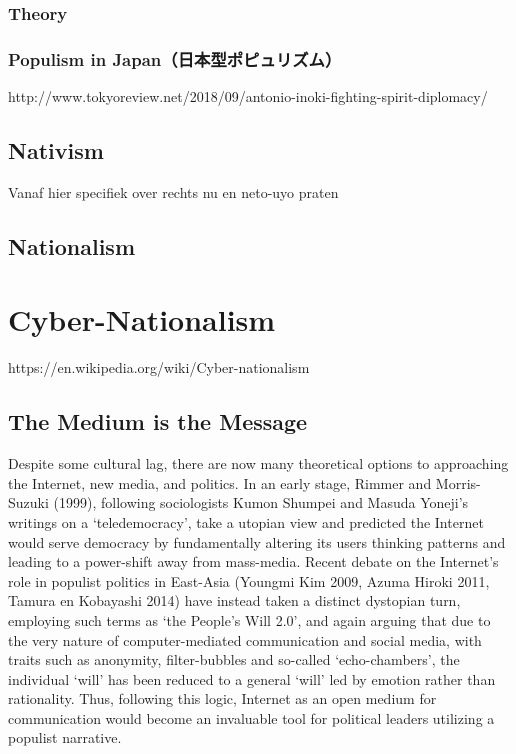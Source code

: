 \documentclass[10pt,british,A4paper,,openany]{memoir}
\begin{document}
\subsubsection{Theory}\label{theory}

\subsubsection{Populism in
Japan（日本型ポピュリズム）}\label{populism-in-japanux65e5ux672cux578bux30ddux30d4ux30e5ux30eaux30baux30e0}

http://www.tokyoreview.net/2018/09/antonio-inoki-fighting-spirit-diplomacy/

\subsection{Nativism}\label{nativism}

Vanaf hier specifiek over rechts nu en neto-uyo praten

\subsection{Nationalism}\label{nationalism}

\section{Cyber-Nationalism}\label{cyber-nationalism}

https://en.wikipedia.org/wiki/Cyber-nationalism

\subsection{The Medium is the Message}\label{the-medium-is-the-message}

Despite some cultural lag, there are now many theoretical options to
approaching the Internet, new media, and politics. In an early stage,
Rimmer and Morris-Suzuki (1999), following sociologists Kumon Shumpei
and Masuda Yoneji's writings on a `teledemocracy', take a utopian view
and predicted the Internet would serve democracy by fundamentally
altering its users thinking patterns and leading to a power-shift away
from mass-media. Recent debate on the Internet's role in populist
politics in East-Asia (Youngmi Kim 2009, Azuma Hiroki 2011, Tamura en
Kobayashi 2014) have instead taken a distinct dystopian turn, employing
such terms as `the People's Will 2.0', and again arguing that due to the
very nature of computer-mediated communication and social media, with
traits such as anonymity, filter-bubbles and so-called `echo-chambers',
the individual `will' has been reduced to a general `will' led by
emotion rather than rationality. Thus, following this logic, Internet as
an open medium for communication would become an invaluable tool for
political leaders utilizing a populist narrative.
\end{document}
